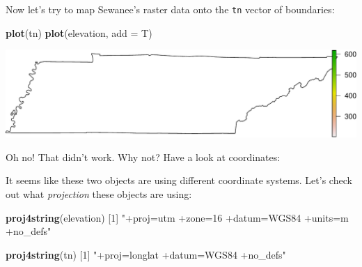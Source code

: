\documentclass[]{book}
\newenvironment{Shaded}{\begin{snugshade}}{\end{snugshade}}
\newcommand{\DataTypeTok}[1]{\textcolor[rgb]{0.13,0.29,0.53}{#1}}
\newcommand{\DecValTok}[1]{\textcolor[rgb]{0.00,0.00,0.81}{#1}}
\newcommand{\FloatTok}[1]{\textcolor[rgb]{0.00,0.00,0.81}{#1}}
\newcommand{\KeywordTok}[1]{\textcolor[rgb]{0.13,0.29,0.53}{\textbf{#1}}}
\newcommand{\NormalTok}[1]{#1}
\newcommand{\OperatorTok}[1]{\textcolor[rgb]{0.81,0.36,0.00}{\textbf{#1}}}
\newcommand{\StringTok}[1]{\textcolor[rgb]{0.31,0.60,0.02}{#1}}
\begin{document}
Now let's try to map Sewanee's raster data onto the \texttt{tn} vector of boundaries:

\begin{Shaded}
\begin{Highlighting}[]
\KeywordTok{plot}\NormalTok{(tn)}
\KeywordTok{plot}\NormalTok{(elevation, }\DataTypeTok{add =}\NormalTok{ T)}
\end{Highlighting}
\end{Shaded}

\includegraphics{figures/unnamed-chunk-648-1.pdf}

Oh no! That didn't work. Why not? Have a look at coordinates:

\begin{Shaded}
\end{Shaded}

It seems like these two objects are using different coordinate systems. Let's check out what \emph{projection} these objects are using:

\begin{Shaded}
\begin{Highlighting}[]
\KeywordTok{proj4string}\NormalTok{(elevation)}
\NormalTok{[}\DecValTok{1}\NormalTok{] }\StringTok{"+proj=utm +zone=16 +datum=WGS84 +units=m +no_defs"}

\KeywordTok{proj4string}\NormalTok{(tn)}
\NormalTok{[}\DecValTok{1}\NormalTok{] }\StringTok{"+proj=longlat +datum=WGS84 +no_defs"}
\end{Highlighting}
\end{Shaded}
\end{document}
